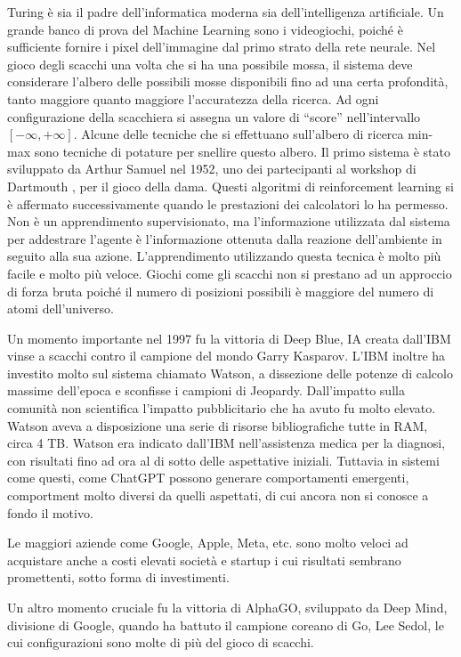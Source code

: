 \documentclass{article}
\numberwithin{equation}{subsection}
\begin{document}
Turing è sia il padre dell'informatica moderna sia dell'intelligenza artificiale. 
Un grande banco di prova del Machine Learning sono i videogiochi, poiché è sufficiente fornire i pixel dell'immagine dal primo strato della rete neurale. Nel gioco 
degli scacchi una volta che si ha una possibile mossa, il sistema deve considerare l'albero delle possibili mosse disponibili fino ad una certa profondità, tanto 
maggiore quanto maggiore l'accuratezza della ricerca. Ad ogni configurazione della scacchiera si assegna un valore di ``score'' nell'intervallo $[-\infty,+\infty]$. 
Alcune delle tecniche che si effettuano sull'albero di ricerca min-max sono tecniche di potature per snellire questo albero. Il primo sistema è stato sviluppato 
da Arthur Samuel nel 1952, uno dei partecipanti al workshop di Dartmouth , per il gioco della dama. Questi algoritmi di reinforcement learning si è affermato 
successivamente quando le prestazioni dei calcolatori lo ha permesso. Non è un apprendimento supervisionato, ma l'informazione utilizzata dal sistema per addestrare 
l'agente è l'informazione ottenuta dalla reazione dell'ambiente in seguito alla sua azione. 
L'apprendimento utilizzando questa tecnica è molto più facile e molto più veloce. 
Giochi come gli scacchi non si prestano ad un approccio di forza bruta poiché il numero di posizioni possibili è maggiore del numero di 
atomi dell'universo. 

Un momento importante nel 1997 fu la vittoria di Deep Blue, IA creata dall'IBM vinse a scacchi contro il campione del mondo Garry Kasparov. 
L'IBM inoltre ha investito molto sul sistema chiamato Watson, a dissezione delle potenze di calcolo massime dell'epoca e sconfisse i campioni di Jeopardy. Dall'impatto 
sulla comunità non scientifica l'impatto pubblicitario che ha avuto fu molto elevato. 
Watson aveva a disposizione una serie di risorse bibliografiche tutte in RAM, circa 4 TB. Watson era indicato dall'IBM nell'assistenza medica per la diagnosi, con risultati 
fino ad ora al di sotto delle aspettative iniziali. 
Tuttavia in sistemi come questi, come ChatGPT possono generare comportamenti emergenti, comportment molto diversi da quelli aspettati, di cui ancora non si conosce 
a fondo il motivo. 

Le maggiori aziende come Google, Apple, Meta, etc. sono molto veloci ad acquistare anche a costi elevati società e startup i cui risultati sembrano promettenti, sotto 
forma di investimenti. 

Un altro momento cruciale fu la vittoria di AlphaGO, sviluppato da Deep Mind, divisione di Google, quando ha battuto il campione coreano di Go, Lee Sedol, le cui configurazioni 
sono molte di più del gioco di scacchi. 
\end{document}
